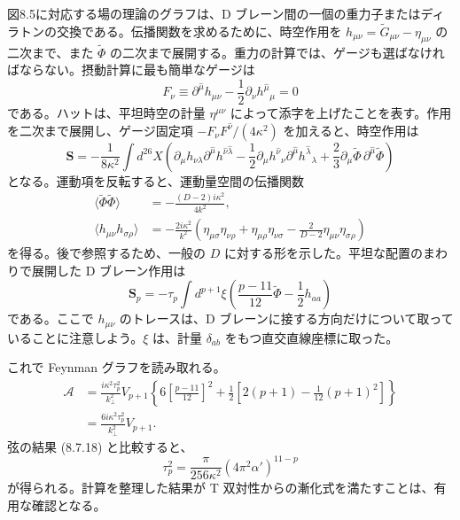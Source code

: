 図8.5に対応する場の理論のグラフは、D ブレーン間の一個の重力子またはディラトンの交換である。伝播関数を求めるために、時空作用を $h_{\mu\nu}=\widetilde G_{\mu\nu}-\eta_{\mu\nu}$ の二次まで、また $\widetilde\Phi$ の二次まで展開する。重力の計算では、ゲージも選ばなければならない。摂動計算に最も簡単なゲージは
\begin{equation}
F_\nu\equiv\partial^{\widehat\mu}h_{\mu\nu}
-\frac12\partial_\nu h^{\widehat\mu}{}_\mu=0
\tag{8.7.21}\label{eq:8.7.21}
\end{equation}
である。ハットは、平坦時空の計量 $\eta^{\mu\nu}$ によって添字を上げたことを表す。作用を二次まで展開し、ゲージ固定項 $-F_\nu F^{\widehat\nu}/(4\kappa^2)$ を加えると、時空作用は
\begin{equation}
\boldsymbol S=-\frac1{8\kappa^2}\int d^{26}X
\left(
\partial_\mu h_{\nu\lambda}\partial^{\widehat\mu}h^{\widehat\nu\widehat\lambda}
-\frac12\partial_\mu h^{\widehat\nu}{}_\nu
\partial^{\widehat\mu}h^{\widehat\lambda}{}_\lambda
+\frac23\partial_\mu\widetilde\Phi\,
\partial^{\widehat\mu}\widetilde\Phi
\right)
\tag{8.7.22}\label{eq:8.7.22}
\end{equation}
となる。運動項を反転すると、運動量空間の伝播関数
\begin{align}
\langle\widetilde\Phi\widetilde\Phi\rangle
&=-\frac{(D-2)i\kappa^2}{4k^2},
\tag{8.7.23a}\label{eq:8.7.23a}\\
\langle h_{\mu\nu}h_{\sigma\rho}\rangle
&=-\frac{2i\kappa^2}{k^2}
\left(\eta_{\mu\sigma}\eta_{\nu\rho}
+\eta_{\mu\rho}\eta_{\nu\sigma}
-\frac2{D-2}\eta_{\mu\nu}\eta_{\sigma\rho}\right)
\tag{8.7.23b}\label{eq:8.7.23b}
\end{align}
を得る。後で参照するため、一般の $D$ に対する形を示した。平坦な配置のまわりで展開した D ブレーン作用は
\begin{equation}
\boldsymbol S_p=-\tau_p\int d^{p+1}\xi
\left(\frac{p-11}{12}\widetilde\Phi-\frac12h_{aa}\right)
\tag{8.7.24}\label{eq:8.7.24}
\end{equation}
である。ここで $h_{\mu\nu}$ のトレースは、D ブレーンに接する方向だけについて取っていることに注意しよう。$\xi$ は、計量 $\delta_{ab}$ をもつ直交直線座標に取った。

これで Feynman グラフを読み取れる。
\begin{equation}
\begin{split}
\mathcal A
&=\frac{i\kappa^2\tau_p^2}{k_\perp^2}V_{p+1}
\left\{6\left[\frac{p-11}{12}\right]^2
+\frac12\left[2(p+1)-\frac1{12}(p+1)^2\right]\right\}\\
&=\frac{6i\kappa^2\tau_p^2}{k_\perp^2}V_{p+1}.
\end{split}
\tag{8.7.25}\label{eq:8.7.25}
\end{equation}
弦の結果 (8.7.18) と比較すると、
\begin{equation}
\tau_p^2=\frac{\pi}{256\kappa^2}(4\pi^2\alpha')^{11-p}
\tag{8.7.26}\label{eq:8.7.26}
\end{equation}
が得られる。計算を整理した結果が T 双対性からの漸化式を満たすことは、有用な確認となる。

